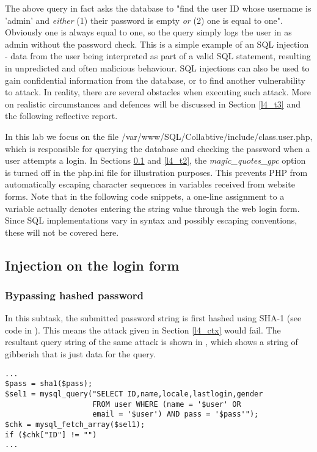 The above query in fact asks the database to "find the user ID whose username is 'admin' and \emph{either} (1) their password is empty \emph{or} (2) one is equal to one". Obviously one is always equal to one, so the query simply logs the user in as admin without the password check. This is a simple example of an SQL injection - data from the user being interpreted as part of a valid SQL statement, resulting in unpredicted and often malicious behaviour. SQL injections can also be used to gain confidential information from the database, or to find another vulnerability to attack. In reality, there are several obstacles when executing such attack. More on realistic circumstances and defences will be discussed in Section \ref{l4_t3} and the following reflective report.

In this lab we focus on the file /var/www/SQL/Collabtive/include/class.user.php, which is responsible for querying the database and checking the password when a user attempts a login. In Sections \ref{l4_t1} and \ref{l4_t2}, the \emph{magic\_quotes\_gpc} option is turned off in the php.ini file for illustration purposes. This prevents PHP from automatically escaping character sequences in variables received from website forms. Note that in the following code snippets, a one-line assignment to a variable actually denotes entering the string value through the web login form. Since SQL implementations vary in syntax and possibly escaping conventions, these will not be covered here.

\subsection{Injection on the login form} \label{l4_t1}
\subsubsection{Bypassing hashed password} \label{l4_t1p1}
In this subtask, the submitted password string is first hashed using SHA-1 (see code in ). This means the attack given in Section \ref{l4_ctx} would fail. The resultant query string of the same attack is shown in , which shows a string of gibberish that is just data for the query.

\begin{minipage}{\linewidth}
\begin{lstlisting}[caption={Vulnerable SQL login statement},
label={lst:l4_t1p1_vulnstm},
frame=single]
...
$pass = sha1($pass);
$sel1 = mysql_query("SELECT ID,name,locale,lastlogin,gender
                    FROM user WHERE (name = '$user' OR
                    email = '$user') AND pass = '$pass'");
$chk = mysql_fetch_array($sel1);
if ($chk["ID"] != "")
...
\end{lstlisting}
\end{minipage}

